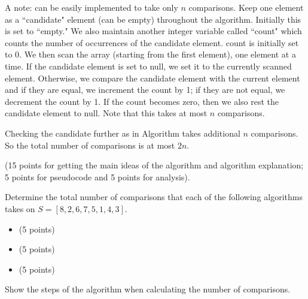 \documentclass{article}
\begin{document}
\begin{solution}
    A note:  can  be easily implemented to take only $n$ comparisons. Keep
    one element as a ``candidate" element  (can be empty) throughout the algorithm. Initially this is set  to ``empty."
    We also maintain another integer variable called ``count" which counts the number of occurrences
    of the candidate element.  count is initially set to 0. We then scan the  array (starting from the first element), one
    element at a time. If the candidate element is set to null, we set it to the currently scanned element.
    Otherwise, we compare the candidate element with the current element and if they are equal, we increment
    the count by 1; if they are not equal, we decrement the count by 1. If the count becomes zero, then
    we also rest the candidate element to null.  Note that this takes at most $n$ comparisons.
    
    Checking the candidate further as in  Algorithm  takes additional $n$ comparisons.
    So the total number of comparisons is at most $2n$.
    
    (15 points for getting the main ideas of the algorithm and algorithm explanation; 5 points for pseudocode
    and 5 points for analysis).
    
    
\end{solution}

\begin{exercise}{5.1}
    Determine the total number of comparisons that each of the following algorithms takes on $S = [8, 2, 6, 7, 5, 1, 4, 3]$.
    \begin{itemize}[nosep]
        \item {} (5 points)
        \item {} (5 points)
        \item {}  (5 points)
    \end{itemize}
    Show the steps of the algorithm when calculating the number of comparisons.
\end{exercise}
\end{document}
